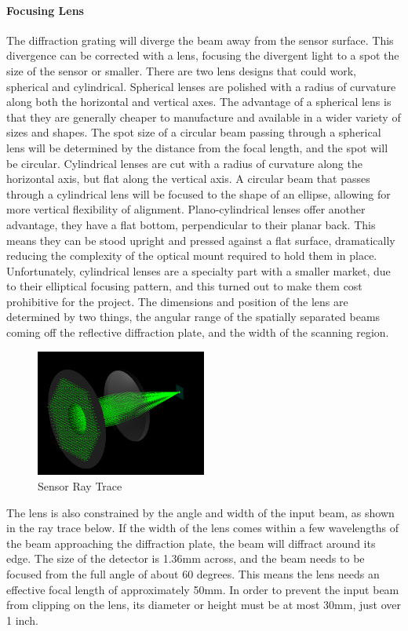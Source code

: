 \paragraph{Focusing Lens} The diffraction grating will diverge the beam away from the sensor surface. This divergence can be corrected with a lens, focusing the divergent light to a spot the size of the sensor or smaller. There are two lens designs that could work, spherical and cylindrical. Spherical lenses are polished with a radius of curvature along both the horizontal and vertical axes. The advantage of a spherical lens is that they are generally cheaper to manufacture and available in a wider variety of sizes and shapes. The spot size of a circular beam passing through a spherical lens will be determined by the distance from the focal length, and the spot will be circular. Cylindrical lenses are cut with a radius of curvature along the horizontal axis, but flat along the vertical axis. A circular beam that passes through a cylindrical lens will be focused to the shape of an ellipse, allowing for more vertical flexibility of alignment. Plano-cylindrical lenses offer another advantage, they have a flat bottom, perpendicular to their planar back. This means they can be stood upright and pressed against a flat surface, dramatically reducing the complexity of the optical mount required to hold them in place. Unfortunately, cylindrical lenses are a specialty part with a smaller market, due to their elliptical focusing pattern, and this turned out to make them cost prohibitive for the project. The dimensions and position of the lens are determined by two things, the angular range of the spatially separated beams coming off the reflective diffraction plate, and the width of the scanning region. 

\begin{figure}[H]
    \caption{Sensor Ray Trace}
    \centering
    \includegraphics[width=0.5\textwidth]{images/ColimatedBeam.png}
\end{figure}

The lens is also constrained by the angle and width of the input beam, as shown in the ray trace below. If the width of the lens comes within a few wavelengths of the beam approaching the diffraction plate, the beam will diffract around its edge. The size of the detector is 1.36mm across, and the beam needs to be focused from the full angle of about 60 degrees. This means the lens needs an effective focal length of approximately 50mm. In order to prevent the input beam from clipping on the lens, its diameter or height must be at most 30mm, just over 1 inch. 

